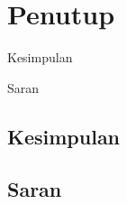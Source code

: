 \subjudul{\lipsum[18][1]}
\chapter{Penutup}

\begin{dibabini}
  \item Kesimpulan
  \item Saran
\end{dibabini}

\section{Kesimpulan}
\lipsum[19-20]

\section{Saran}
\lipsum[21]
